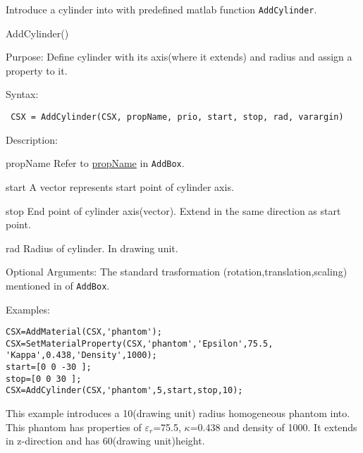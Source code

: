 Introduce a cylinder into\hyperref[CSX]{} with predefined matlab function \texttt{AddCylinder}.

\begin{FontNameFunct}{AddCylinder()}
\end{FontNameFunct}

\begin{FontDescr}{Purpose:}
Define cylinder with its axis(where it extends) and radius and assign a property to it. 
\end{FontDescr}

\begin{FontDescr}{Syntax:}
\begin{lstlisting} 
 CSX = AddCylinder(CSX, propName, prio, start, stop, rad, varargin)
\end{lstlisting}
\end{FontDescr}

\begin{FontDescr}{Description:}

\begin{FontPara}{propName}
Refer to \hyperref[prim_Name]{propName} in \texttt{AddBox}. 
\end{FontPara}

\begin{FontPara}{start}
A vector represents start point of cylinder axis.  
\end{FontPara}

\begin{FontPara}{stop}
End point of cylinder axis(vector). Extend in the same direction as start point.  
\end{FontPara}

\begin{FontPara}{rad}
Radius of cylinder. In drawing unit. 
\end{FontPara}
\end{FontDescr}

\begin{FontDescr}{Optional Arguments:}
The standard trasformation (rotation,translation,scaling) mentioned in  \hyperref[prim_transform]{} of \texttt{AddBox}.  
\end{FontDescr}

\begin{FontDescr}{Examples:}

\begin{lstlisting} 
CSX=AddMaterial(CSX,'phantom');
CSX=SetMaterialProperty(CSX,'phantom','Epsilon',75.5,
'Kappa',0.438,'Density',1000);
start=[0 0 -30 ];
stop=[0 0 30 ];
CSX=AddCylinder(CSX,'phantom',5,start,stop,10);
\end{lstlisting}
This example introduces a 10(drawing unit) radius homogeneous phantom into\hyperref[CSX]{}. This phantom has properties of $\varepsilon_{r}$=75.5, $\kappa$=0.438 and density of 1000. It extends in z-direction and has 60(drawing unit)height.  

\end{FontDescr}
